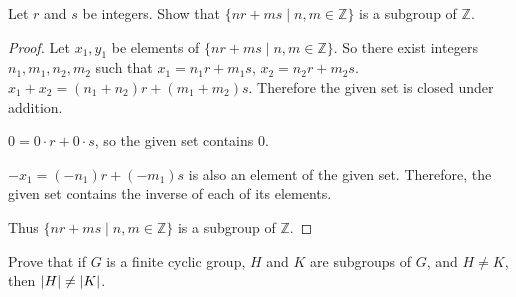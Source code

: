 \begin{exercise}
    Let $r$ and $s$ be integers. Show that $\{ nr + ms \mid n, m \in \mathbb{Z} \}$ is a subgroup of $\mathbb{Z}$.
\end{exercise}

\begin{proof}
    Let $x_{1}, y_{1}$ be elements of $\{ nr + ms \mid n, m \in \mathbb{Z} \}$. So there exist integers $n_{1}, m_{1}, n_{2}, m_{2}$ such that $x_{1} = n_{1}r + m_{1}s$, $x_{2} = n_{2}r + m_{2}s$. $x_{1} + x_{2} = (n_{1} + n_{2})r + (m_{1} + m_{2})s$. Therefore the given set is closed under addition.

    $0 = 0\cdot r + 0\cdot s$, so the given set contains $0$.

    $-x_{1} = (-n_{1})r + (-m_{1})s$ is also an element of the given set. Therefore, the given set contains the inverse of each of its elements.

    Thus $\{ nr + ms \mid n, m \in \mathbb{Z} \}$ is a subgroup of $\mathbb{Z}$.
\end{proof}

\begin{exercise}
    Prove that if $G$ is a finite cyclic group, $H$ and $K$ are subgroups of $G$, and $H\ne K$, then $\left\vert{H}\right\vert \ne \left\vert{K}\right\vert$.
\end{exercise}

